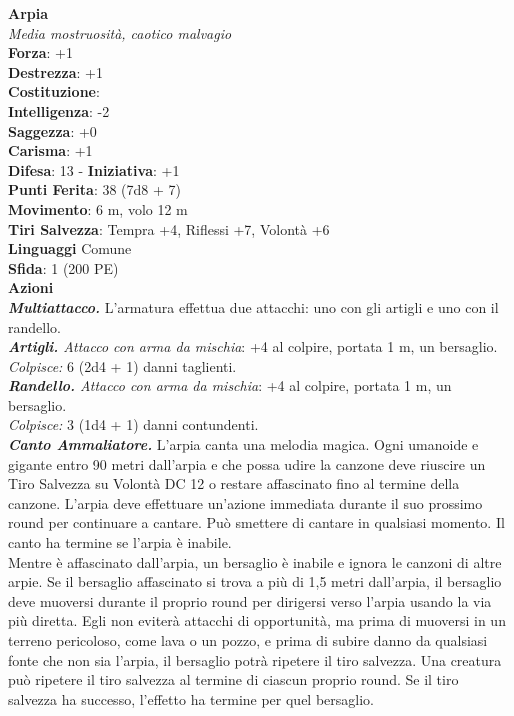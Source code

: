 \begin{multicols}{2}
\medskip\textbf{Arpia}\\
\emph{Media mostruosità, caotico malvagio}\\
\textbf{Forza}: +1\\
\textbf{Destrezza}: +1\\
\textbf{Costituzione}: \\\textbf{Intelligenza}: -2\\
\textbf{Saggezza}: +0\\
\textbf{Carisma}: +1\\
\textbf{Difesa}: 13 - \textbf{Iniziativa}: +1\\
\textbf{Punti Ferita}: 38 (7d8 + 7)\\
\textbf{Movimento}: 6 m, volo 12 m\\
\textbf{Tiri Salvezza}: Tempra +4, Riflessi +7, Volontà +6\\
\textbf{Linguaggi} Comune\\
\textbf{Sfida}: 1 (200 PE)\smallskip\\
\smallskip\textbf{Azioni}\\
\emph{\textbf{Multiattacco.}} L'armatura effettua due attacchi: uno con gli artigli e uno con il randello.\\
\emph{\textbf{Artigli.} Attacco con arma da mischia}: +4 al colpire, portata 1 m, un bersaglio.\\
\emph{Colpisce:} 6 (2d4 + 1) danni taglienti.\\
\emph{\textbf{Randello.} Attacco con arma da mischia}: +4 al colpire, portata 1 m, un bersaglio.\\
\emph{Colpisce:} 3 (1d4 + 1) danni contundenti.\\
\emph{\textbf{Canto Ammaliatore.}} L'arpia canta una melodia magica. Ogni umanoide e gigante entro 90 metri dall'arpia e che possa udire la canzone deve riuscire un Tiro Salvezza su Volontà DC  12 o restare affascinato fino al termine della canzone. L'arpia deve effettuare un'azione immediata durante il suo prossimo round per continuare a cantare. Può smettere di cantare in qualsiasi momento. Il canto ha termine se l'arpia è inabile.\\
Mentre è affascinato dall'arpia, un bersaglio è inabile e ignora le canzoni di altre arpie. Se il bersaglio affascinato si trova a più di 1,5 metri dall'arpia, il bersaglio deve muoversi durante il proprio round per dirigersi verso l'arpia usando la via più diretta. Egli non eviterà attacchi di opportunità, ma prima di muoversi in un terreno pericoloso, come lava o un pozzo, e prima di subire danno da qualsiasi fonte che non sia l'arpia, il bersaglio potrà ripetere il tiro salvezza. Una creatura può ripetere il tiro salvezza al termine di ciascun proprio round. Se il tiro salvezza ha successo, l'effetto ha termine per quel bersaglio.\\

\end{multicols}
